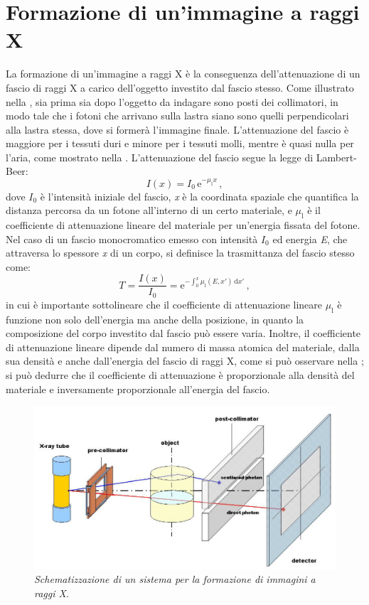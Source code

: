 \section{Formazione di un'immagine a raggi X}
La formazione di un'immagine a raggi X è la conseguenza dell'attenuazione di un fascio di raggi X a carico dell'oggetto investito dal fascio stesso. Come illustrato nella , sia prima sia dopo l'oggetto da indagare sono posti dei collimatori, in modo tale che i fotoni che arrivano sulla lastra siano sono quelli perpendicolari alla lastra stessa, dove si formerà l'immagine finale. L'attenuazione del fascio è maggiore per i tessuti duri e minore per i tessuti molli, mentre è quasi nulla per l'aria, come mostrato nella . L'attenuazione del fascio segue la legge di Lambert-Beer:
\begin{equation}\label{lambert}
    I(x) = I_0\,\mathrm{e}^{-\mu_\mathrm{l}x}\,,
\end{equation}
dove $I_0$ è l'intensità iniziale del fascio, \textit{x} è la coordinata spaziale che quantifica la distanza percorsa da un fotone all'interno di un certo materiale, e $\mu_\mathrm{l}$ è il coefficiente di attenuazione lineare del materiale per un'energia fissata del fotone. Nel caso di un fascio monocromatico emesso con intensità $I_0$ ed energia \textit{E}, che attraversa lo spessore \textit{x} di un corpo, si definisce la trasmittanza del fascio stesso come:
\begin{equation}
    T = \frac{I(x)}{I_0} = \mathrm{e}^{-\int_0^x \mu_\mathrm{l}(E,x')\,\mathrm{d}x'}\,,
\end{equation}
in cui è importante sottolineare che il coefficiente di attenuazione lineare $\mu_\mathrm{l}$ è funzione non solo dell'energia ma anche della posizione, in quanto la composizione del corpo investito dal fascio può essere varia. Inoltre, il coefficiente di attenuazione lineare dipende dal numero di massa atomica del materiale, dalla sua densità e anche dall'energia del fascio di raggi X, come si può osservare nella ; si può dedurre che il coefficiente di attenuazione è proporzionale alla densità del materiale e inversamente proporzionale all'energia del fascio.
\begin{figure}[htp]
\centering
\includegraphics[scale=0.6]{Immagini/apparatox.png}
\caption{\label{fig:apparatox} \textit{Schematizzazione di un sistema per la formazione di immagini a raggi X}.}
\end{figure}
